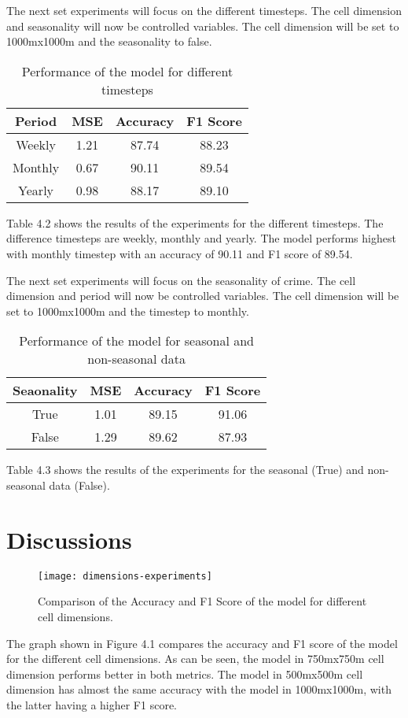     The next set experiments will focus on the different timesteps. The cell dimension and seasonality will now be controlled variables. The cell dimension will be set to 1000mx1000m and the seasonality to false.
    \begin{table}[h]
      \centering
      \begin{tabular}{|c|c|c|c|}
            \hline
          \textbf{Period}  &\textbf{MSE}  &\textbf{Accuracy} &\textbf{F1 Score}\\ 
          \hline
          Weekly &1.21 &87.74 &88.23 \\
          Monthly &0.67 &90.11 &89.54 \\
          Yearly   &0.98 &88.17 &89.10 \\
          \hline
        \end{tabular}
      \caption{Performance of the model for different timesteps}
    \end{table}
    Table 4.2 shows the results of the experiments for the different timesteps. The difference timesteps are weekly, monthly and yearly. The model performs highest with monthly timestep with an accuracy of 90.11 and F1 score of 89.54.

    The next set experiments will focus on the seasonality of crime. The cell dimension and period will now be controlled variables. The cell dimension will be set to 1000mx1000m and the timestep to monthly.
    \begin{table}[h]
      \centering
      \begin{tabular}{|c|c|c|c|}
            \hline
          \textbf{Seaonality}  &\textbf{MSE}  &\textbf{Accuracy} &\textbf{F1 Score}\\ 
          \hline
          True &1.01 &89.15 &91.06\\
          False  &1.29 &89.62 &87.93 \\
          \hline
        \end{tabular}
      \caption{Performance of the model for seasonal and non-seasonal data}
    \end{table}
    Table 4.3 shows the results of the experiments for the seasonal (True) and non-seasonal data (False).

\section{Discussions}
    \begin{figure}[H]
    \centering
    \texttt{[image: dimensions-experiments]}
    \caption{Comparison of the Accuracy and F1 Score of the model for different cell dimensions.}
    \end{figure}
    The graph shown in Figure 4.1 compares the accuracy and F1 score of the model for the different cell dimensions. As can be seen, the model in 750mx750m cell dimension performs better in both metrics. The model in 500mx500m cell dimension has almost the same accuracy with the model in 1000mx1000m, with the latter having a higher F1 score.

